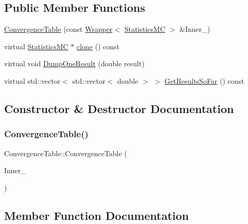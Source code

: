 \subsection*{Public Member Functions}
\begin{DoxyCompactItemize}
\item 
\hyperlink{classConvergenceTable_afcbd128680460340e121769f3cdc7e69}{Convergence\+Table} (const \hyperlink{classWrapper}{Wrapper}$<$ \hyperlink{classStatisticsMC}{Statistics\+MC} $>$ \&Inner\+\_\+)
\item 
virtual \hyperlink{classStatisticsMC}{Statistics\+MC} $\ast$ \hyperlink{classConvergenceTable_a129d95361fa2dd5a6ad43d4320f40682}{clone} () const
\item 
virtual void \hyperlink{classConvergenceTable_ae4ebb3988c6a8bc4e81049bfacf388e2}{Dump\+One\+Result} (double result)
\item 
virtual std\+::vector$<$ std\+::vector$<$ double $>$ $>$ \hyperlink{classConvergenceTable_a74d6d80fbfb1af7cd27ab306f0f619c0}{Get\+Results\+So\+Far} () const
\end{DoxyCompactItemize}


\subsection{Constructor \& Destructor Documentation}
\hypertarget{classConvergenceTable_afcbd128680460340e121769f3cdc7e69}{}\label{classConvergenceTable_afcbd128680460340e121769f3cdc7e69} 
\subsubsection{\texorpdfstring{Convergence\+Table()}{ConvergenceTable()}}
{\footnotesize\ttfamily Convergence\+Table\+::\+Convergence\+Table (\begin{DoxyParamCaption}\item[{const \hyperlink{classWrapper}{Wrapper}$<$ \hyperlink{classStatisticsMC}{Statistics\+MC} $>$ \&}]{Inner\+\_\+ }\end{DoxyParamCaption})}



\subsection{Member Function Documentation}
\hypertarget{classConvergenceTable_a129d95361fa2dd5a6ad43d4320f40682}{}\label{classConvergenceTable_a129d95361fa2dd5a6ad43d4320f40682} 
